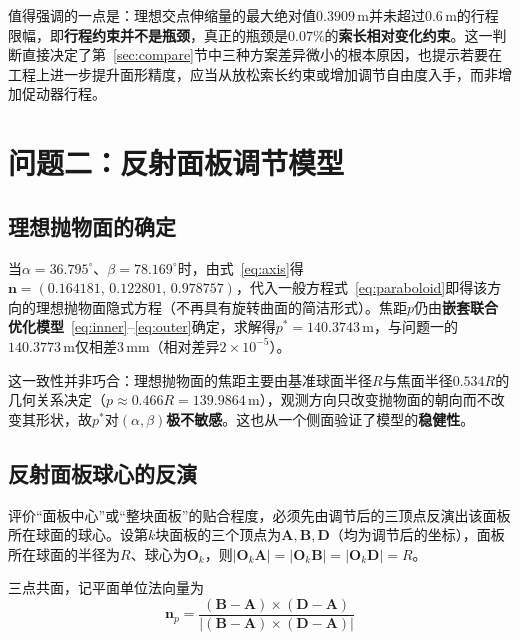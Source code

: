 \documentclass[withoutpreface]{cumcmthesis}
\begin{document}
值得强调的一点是：理想交点伸缩量的最大绝对值$0.3909\,\mathrm{m}$并未超过$0.6\,\mathrm{m}$的行程限幅，即\textbf{行程约束并不是瓶颈}，真正的瓶颈是$0.07\%$的\textbf{索长相对变化约束}。这一判断直接决定了第~\ref{sec:compare}节中三种方案差异微小的根本原因，也提示若要在工程上进一步提升面形精度，应当从放松索长约束或增加调节自由度入手，而非增加促动器行程。

\section{问题二：反射面板调节模型}

\subsection{理想抛物面的确定}\label{sec:q2intro}

当$\alpha=36.795^{\circ}$、$\beta=78.169^{\circ}$时，由式~\eqref{eq:axis}得$\mathbf{n}=(0.164181,\,0.122801,\,0.978757)$，代入一般方程式~\eqref{eq:paraboloid}即得该方向的理想抛物面隐式方程（不再具有旋转曲面的简洁形式）。焦距$p$仍由\textbf{嵌套联合优化模型}~\eqref{eq:inner}--\eqref{eq:outer}确定，求解得$p^{*}=140.3743\,\mathrm{m}$，与问题一的$140.3773\,\mathrm{m}$仅相差$3\,\mathrm{mm}$（相对差异$2\times10^{-5}$）。

这一致性并非巧合：理想抛物面的焦距主要由基准球面半径$R$与焦面半径$0.534R$的几何关系决定（$p\approx0.466R=139.9864\,\mathrm{m}$），观测方向只改变抛物面的朝向而不改变其形状，故$p^{*}$对$(\alpha,\beta)$\textbf{极不敏感}。这也从一个侧面验证了模型的\textbf{稳健性}。

\subsection{反射面板球心的反演}\label{sec:center}

评价``面板中心''或``整块面板''的贴合程度，必须先由调节后的三顶点反演出该面板所在球面的球心。设第$k$块面板的三个顶点为$\mathbf{A},\mathbf{B},\mathbf{D}$（均为调节后的坐标），面板所在球面的半径为$R$、球心为$\mathbf{O}_k$，则$|\mathbf{O}_k\mathbf{A}|=|\mathbf{O}_k\mathbf{B}|=|\mathbf{O}_k\mathbf{D}|=R$。

三点共面，记平面单位法向量为
\begin{equation}\label{eq:np}
\mathbf{n}_p=\frac{(\mathbf{B}-\mathbf{A})\times(\mathbf{D}-\mathbf{A})}{\left|(\mathbf{B}-\mathbf{A})\times(\mathbf{D}-\mathbf{A})\right|}
\end{equation}
\end{document}
